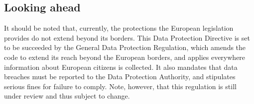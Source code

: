 \documentclass[11pt, a4paper]{article}
\begin{document}





\subsection{Looking ahead}

It should be noted that, currently, the protections the European legislation provides do not extend beyond its borders.
This Data Protection Directive is set to be succeeded by the General Data Protection Regulation, which amends the code to extend its reach beyond the European borders, and applies everywhere information about European citizens is collected.
It also mandates that data breaches must be reported to the Data Protection Authority, and stipulates serious fines for failure to comply.
Note, however, that this regulation is still under review and thus subject to change.
\end{document}

